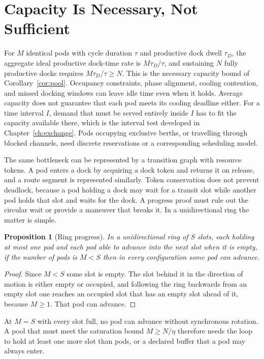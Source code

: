 \documentclass[11pt,openany]{book}
\theoremstyle{plain}
\newtheorem{proposition}[theorem]{Proposition}
\theoremstyle{definition}
\theoremstyle{remark}
\begin{document}
\section{Capacity Is Necessary, Not Sufficient}

For $M$ identical pods with cycle duration $\tau$ and productive dock dwell $\tau_D$, the aggregate ideal productive dock-time rate is $M\tau_D/\tau$, and sustaining $N$ fully productive docks requires $M\tau_D/\tau\ge N$. This is the necessary capacity bound of Corollary~\ref{cor:pool}. Occupancy constraints, phase alignment, cooling contention, and missed docking windows can leave idle time even when it holds. Average capacity does not guarantee that each pod meets its cooling deadline either. For a time interval $I$, demand that must be served entirely inside $I$ has to fit the capacity available there, which is the interval test developed in Chapter~\ref{ch:exchange}. Pods occupying exclusive berths, or travelling through blocked channels, need discrete reservations or a corresponding scheduling model.

The same bottleneck can be represented by a transition graph with resource tokens. A pod enters a dock by acquiring a dock token and returns it on release, and a route segment is represented similarly. Token conservation does not prevent deadlock, because a pod holding a dock may wait for a transit slot while another pod holds that slot and waits for the dock. A progress proof must rule out the circular wait or provide a maneuver that breaks it. In a unidirectional ring the matter is simple.

\begin{proposition}[Ring progress]
\label{prop:ring}
In a unidirectional ring of $S$ slots, each holding at most one pod and each pod able to advance into the next slot when it is empty, if the number of pods is $M<S$ then in every configuration some pod can advance.
\end{proposition}
\begin{proof}
Since $M<S$ some slot is empty. The slot behind it in the direction of motion is either empty or occupied, and following the ring backwards from an empty slot one reaches an occupied slot that has an empty slot ahead of it, because $M\ge1$. That pod can advance.
\end{proof}

At $M=S$ with every slot full, no pod can advance without synchronous rotation. A pool that must meet the saturation bound $M\ge N/\eta$ therefore needs the loop to hold at least one more slot than pods, or a declared buffer that a pod may always enter.
\end{document}
